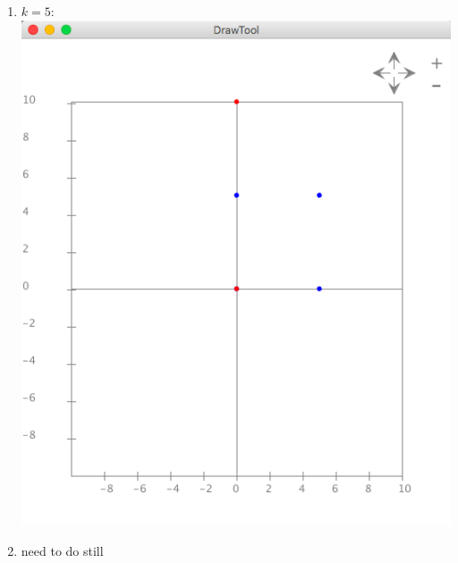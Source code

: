 \documentclass{article}
\begin{document}
\begin{enumerate}
\item $k=5$:\\
\includegraphics[scale=0.4]{exercise8_k5}\\

\item need to do still


\end{enumerate}
\end{document}
